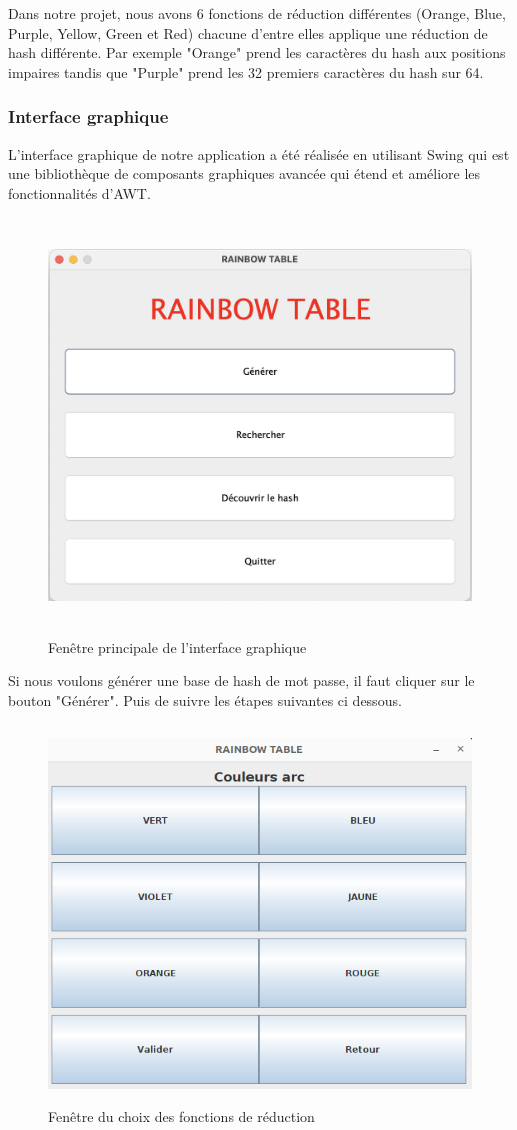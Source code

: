 \documentclass[a4paper,12pt]{article}
\begin{document}
    Dans notre projet, nous avons 6 fonctions de réduction différentes (Orange, Blue, Purple, Yellow, Green et Red) chacune d'entre elles applique une réduction de hash différente. Par exemple "Orange" prend les caractères du hash aux positions impaires tandis que "Purple" prend les 32 premiers caractères du hash sur 64.
    
    \subsubsection{Interface graphique}
    L'interface graphique de notre application a été réalisée en utilisant Swing qui est une bibliothèque de composants graphiques avancée qui étend et améliore les fonctionnalités d'AWT.\newline
    \begin{figure}[H]
    \centering
    \includegraphics[height=11cm]{img/interface.png}
    \caption{Fenêtre principale de l'interface graphique}
    \end{figure}
     Si nous voulons générer une base de hash de mot passe, il faut cliquer sur le bouton "Générer". Puis de suivre les étapes suivantes ci dessous.
    \begin{figure}[H]
    \centering
    \includegraphics[height=10cm]{img/interface_couleurs.png}
    \caption{Fenêtre du choix des fonctions de réduction}
    \end{figure}
\end{document}
